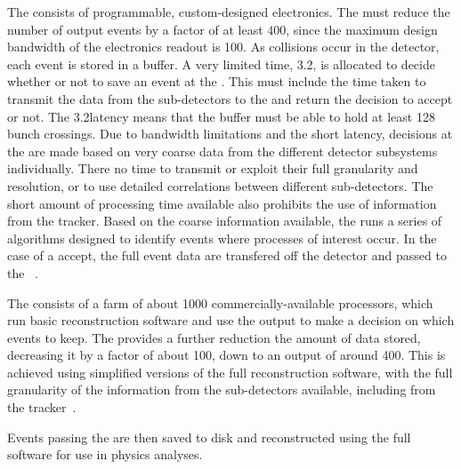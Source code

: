The \LI consists of programmable, custom-designed electronics. The \LI must reduce the number of output events by a factor of at least 400, since the maximum design bandwidth of the \subdetector electronics readout is 100\kHz. As collisions occur in the \CMS detector, each event is stored in a buffer. A very limited time, 3.2\us, is allocated to decide whether or not to save an event at the \LI. This must include the time taken to transmit the data from the sub-detectors to the \LI and return the decision to accept or not. The 3.2\us latency means that the buffer must be able to hold at least 128 bunch crossings. Due to bandwidth limitations and the short latency, decisions at the \LI are made based on very coarse data from the different detector subsystems individually. There no time to transmit or exploit their full granularity and resolution, or to use detailed correlations between different sub-detectors. The short amount of processing time available also prohibits the use of information from the tracker. Based on the coarse information available, the \LI runs a series of algorithms designed to identify events where processes of interest occur. In the case of a \LI accept, the full event data are transfered off the detector and passed to the \HLT~\cite{CMSatLHC}.

The \HLT consists of a farm of about 1000 commercially-available processors, which run basic reconstruction software and use the output to make a decision on which events to keep. The \HLT provides a further reduction the amount of data stored, decreasing it by a factor of about 100, down to an output of around 400\Hz. This is achieved using simplified versions of the full \CMS reconstruction software, with the full granularity of the information from the \CMS sub-detectors available, including from the tracker~\cite{CMSatLHC}.

Events passing the \HLT are then saved to disk and reconstructed using the full \CMS software for use in physics analyses.

